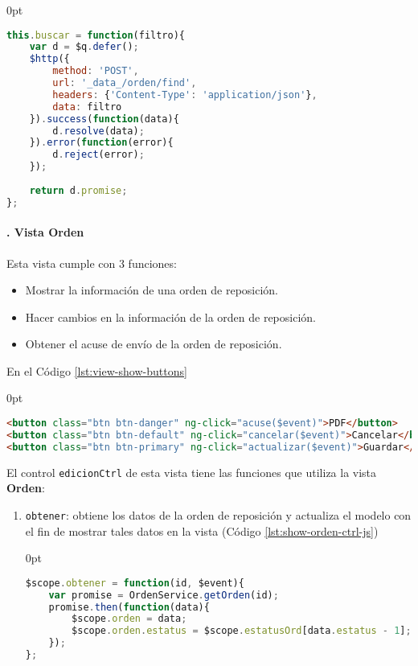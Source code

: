 \begin{enumerate}
\pagebreak

\begin{adjustwidth}{\listingfixwidth}{0pt}
\begin{lstlisting}[language=Javascript, caption={Servicio de \textit{AngularJS} para buscar órdenes de reposición.}, captionpos=b, label={lst:search-service-js}]
this.buscar = function(filtro){
	var d = $q.defer();
	$http({
		method: 'POST',
		url: '_data_/orden/find',
		headers: {'Content-Type': 'application/json'},
		data: filtro
	}).success(function(data){
		d.resolve(data);
	}).error(function(error){
		d.reject(error);
	});
	
	return d.promise;
};
\end{lstlisting}
\end{adjustwidth}

\paragraph{. Vista Orden\\}
Esta vista cumple con 3 funciones:
\begin{itemize}
	\item Mostrar la información de una orden de reposición.
	\item Hacer cambios en la información de la orden de reposición.
	\item Obtener el acuse de envío de la orden de reposición.
\end{itemize}
En el Código \ref{lst:view-show-buttons}
\begin{adjustwidth}{\listingfixwidth}{0pt}
\begin{lstlisting}[language=HTML, captionpos=b, caption={Controles de la vista de orden de reposición.}, label={lst:view-show-buttons}]
<button class="btn btn-danger" ng-click="acuse($event)">PDF</button>
<button class="btn btn-default" ng-click="cancelar($event)">Cancelar</button>
<button class="btn btn-primary" ng-click="actualizar($event)">Guardar</button>
\end{lstlisting}
\end{adjustwidth}

El control \texttt{edicionCtrl} de esta vista tiene las funciones que utiliza la vista \textbf{Orden}:
\begin{enumerate}
	\item \texttt{obtener}: obtiene los datos de la orden de reposición y actualiza el modelo con el fin de mostrar tales datos en la vista (Código \ref{lst:show-orden-ctrl-js})
\begin{adjustwidth}{\listingfixlargewidth}{0pt}
\begin{lstlisting}[language=Javascript, caption={Función del controlador para llenar los datos de la vista de orden de reposición.}, captionpos=b, label={lst:show-orden-ctrl-js}]
$scope.obtener = function(id, $event){
	var promise = OrdenService.getOrden(id);
	promise.then(function(data){
		$scope.orden = data;
		$scope.orden.estatus = $scope.estatusOrd[data.estatus - 1];
	});
};
\end{lstlisting}
\end{adjustwidth}


\end{enumerate}
\end{enumerate}
